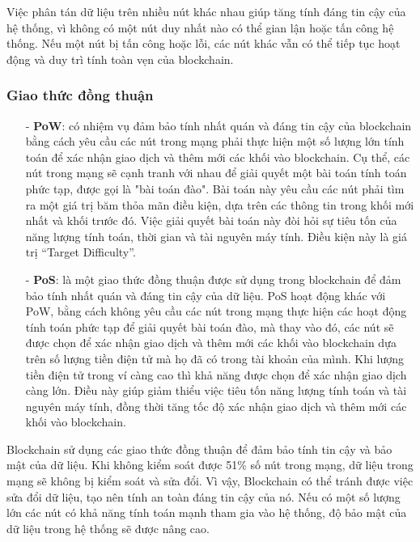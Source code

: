 Việc phân tán dữ liệu trên nhiều nút khác nhau giúp tăng tính đáng tin cậy của 
hệ thống, vì không có một nút duy nhất nào có thể gian lận hoặc tấn công hệ 
thống. Nếu một nút bị tấn công hoặc lỗi, các nút khác vẫn có thể tiếp tục 
hoạt động và duy trì tính toàn vẹn của blockchain.

\subsubsection{Giao thức đồng thuận}
\begin{itemize}
    \item[-] \textbf{PoW}: có nhiệm vụ đảm bảo 
    tính nhất quán và đáng tin cậy của blockchain bằng cách yêu cầu các nút 
    trong mạng phải thực hiện một số lượng lớn tính toán để xác nhận giao dịch
    và thêm mới các khối vào blockchain. Cụ thể, các nút trong mạng sẽ cạnh 
    tranh với nhau để giải quyết một bài toán tính toán phức tạp, được gọi là 
    "bài toán đào". Bài toán này yêu cầu các nút phải tìm ra một giá trị băm 
    thỏa mãn điều kiện, dựa trên các thông tin trong khối mới nhất và khối trước đó. 
    Việc giải quyết bài toán này đòi hỏi sự tiêu tốn của năng lượng tính toán, 
    thời gian và tài nguyên máy tính. Điều kiện này là giá trị “Target Difficulty”.
    \item[-] \textbf{PoS}: là một giao thức đồng thuận được sử 
    dụng trong blockchain để đảm bảo tính nhất quán và đáng tin cậy của dữ 
    liệu. PoS hoạt động khác với PoW, bằng cách không yêu cầu các nút trong 
    mạng thực hiện các hoạt động tính toán phức tạp để giải quyết bài toán đào, 
    mà thay vào đó, các nút sẽ được chọn để xác nhận giao dịch và thêm mới các 
    khối vào blockchain dựa trên số lượng tiền điện tử mà họ đã có trong tài 
    khoản của mình. Khi lượng tiền điện tử trong ví càng cao thì khả năng được chọn 
    để xác nhận giao dịch càng lớn. Điều này giúp giảm thiểu việc tiêu tốn năng
    lượng tính toán và tài nguyên máy tính, đồng thời tăng tốc độ xác nhận giao
    dịch và thêm mới các khối vào blockchain.
    
\end{itemize}


Blockchain sử dụng các giao thức đồng thuận để đảm bảo tính tin cậy và bảo mật của 
dữ liệu. Khi không kiểm soát được 51\% số nút trong mạng, dữ liệu trong mạng sẽ 
không bị kiểm soát và sửa đổi. Vì vậy, Blockchain có thể tránh được việc sửa đổi dữ 
liệu, tạo nên tính an toàn đáng tin cậy của nó. Nếu có một số lượng lớn các nút có 
khả năng tính toán mạnh tham gia vào hệ thống, độ bảo mật của dữ liệu trong hệ thống 
sẽ được nâng cao.

